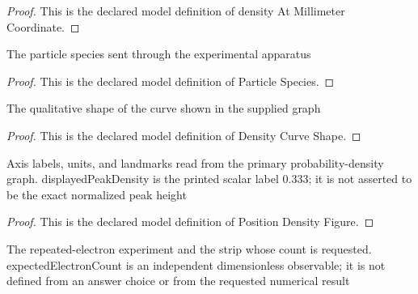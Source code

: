 \begin{proof}
  This is the declared model definition of density At Millimeter Coordinate.
\end{proof}
\begin{definition}
  \label{def:physics:phyx-mini-0501:phyxminiproblems-problemphyxmini0501-particlespecies}
  The particle species sent through the experimental apparatus
\end{definition}
\begin{proof}
  This is the declared model definition of Particle Species.
\end{proof}
\begin{definition}
  \label{def:physics:phyx-mini-0501:phyxminiproblems-problemphyxmini0501-densitycurveshape}
  The qualitative shape of the curve shown in the supplied graph
\end{definition}
\begin{proof}
  This is the declared model definition of Density Curve Shape.
\end{proof}
\begin{definition}
  \label{def:physics:phyx-mini-0501:phyxminiproblems-problemphyxmini0501-positiondensityfigure}
  Axis labels, units, and landmarks read from the primary probability-density graph. displayedPeakDensity is the printed scalar label 0.333; it is not asserted to be the exact normalized peak height
\end{definition}
\begin{proof}
  This is the declared model definition of Position Density Figure.
\end{proof}
\begin{definition}
  \label{def:physics:phyx-mini-0501:phyxminiproblems-problemphyxmini0501-electronstripexperiment}
  The repeated-electron experiment and the strip whose count is requested. expectedElectronCount is an independent dimensionless observable; it is not defined from an answer choice or from the requested numerical result
\end{definition}
